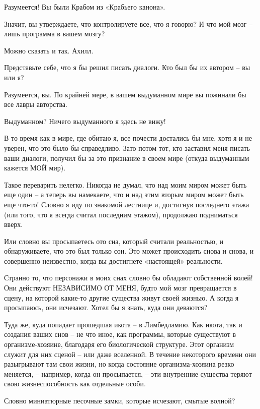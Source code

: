 \documentclass[../main.tex]{subfiles}
\begin{document}
\begin{dialogue}
 Разумеется! Вы были Крабом из «Крабьего канона».

 Значит, вы утверждаете, что контролируете все, что я говорю? И что мой мозг \--- лишь программа в вашем мозгу?

 Можно сказать и так. Ахилл.

 Представьте себе, что я бы решил писать диалоги. Кто был бы их автором \--- вы или я?

 Разумеется, вы. По крайней мере, в вашем выдуманном мире вы пожинали бы все лавры авторства.

 Выдуманном? Ничего выдуманного я здесь не вижу!

 В то время как в мире, где обитаю я, все почести достались бы мне, хотя я и не уверен, что это было бы справедливо. Зато потом тот, кто заставил меня писать ваши диалоги, получил бы за это признание в своем мире (откуда выдуманным кажется МОЙ мир).

 Такое переварить нелегко. Никогда не думал, что над моим миром может быть еще один \--- а теперь вы намекаете, что и над этим вторым миром может быть еще что-то! Словно я иду по знакомой лестнице и, достигнув последнего этажа (или того, что я всегда считал последним этажом), продолжаю подниматься вверх.

 Или словно вы просыпаетесь ото сна, который считали реальностью, и обнаруживаете, что это был только сон. Это может происходить снова и снова, и совершенно неизвестно, когда вы достигнете «настоящей» реальности.

 Странно то, что персонажи в моих снах словно бы обладают собственной волей! Они действуют НЕЗАВИСИМО ОТ МЕНЯ, будто мой мозг превращается в сцену, на которой какие-то другие существа живут своей жизнью. А когда я просыпаюсь, они исчезают. Хотел бы я знать, куда они деваются?

 Туда же, куда попадает прошедшая икота \--- в Лимбедламию. Как икота, так и создания ваших снов \--- не что иное, как программы, которые существуют в организме-хозяине, благодаря его биологической структуре. Этот организм служит для них сценой \--- или даже вселенной. В течение некоторого времени они разыгрывают там свои жизни, но когда состояние организма-хозяина резко меняется, \--- например, когда он просыпается, \--- эти внутренние существа теряют свою жизнеспособность как отдельные особи.

 Словно миниатюрные песочные замки, которые исчезают, смытые волной?


\end{dialogue}
\end{document}
